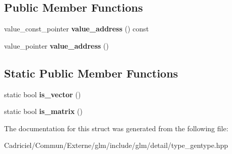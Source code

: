 \subsection*{Public Member Functions}
\begin{DoxyCompactItemize}
\item 
value\+\_\+const\+\_\+pointer {\bfseries value\+\_\+address} () const \hypertarget{structglm_1_1detail_1_1gen_type_a63fb77e77082f34c0a0d7faa0906f7f4}{}\label{structglm_1_1detail_1_1gen_type_a63fb77e77082f34c0a0d7faa0906f7f4}

\item 
value\+\_\+pointer {\bfseries value\+\_\+address} ()\hypertarget{structglm_1_1detail_1_1gen_type_a146973ec142766743080c1895a9e3c65}{}\label{structglm_1_1detail_1_1gen_type_a146973ec142766743080c1895a9e3c65}

\end{DoxyCompactItemize}
\subsection*{Static Public Member Functions}
\begin{DoxyCompactItemize}
\item 
static bool {\bfseries is\+\_\+vector} ()\hypertarget{structglm_1_1detail_1_1gen_type_ae83087df55201bdc46a37decf3d1c34c}{}\label{structglm_1_1detail_1_1gen_type_ae83087df55201bdc46a37decf3d1c34c}

\item 
static bool {\bfseries is\+\_\+matrix} ()\hypertarget{structglm_1_1detail_1_1gen_type_a78c650375558d5e2ccfba383cdb59479}{}\label{structglm_1_1detail_1_1gen_type_a78c650375558d5e2ccfba383cdb59479}

\end{DoxyCompactItemize}


The documentation for this struct was generated from the following file\+:\begin{DoxyCompactItemize}
\item 
Cadriciel/\+Commun/\+Externe/glm/include/glm/detail/type\+\_\+gentype.\+hpp\end{DoxyCompactItemize}

